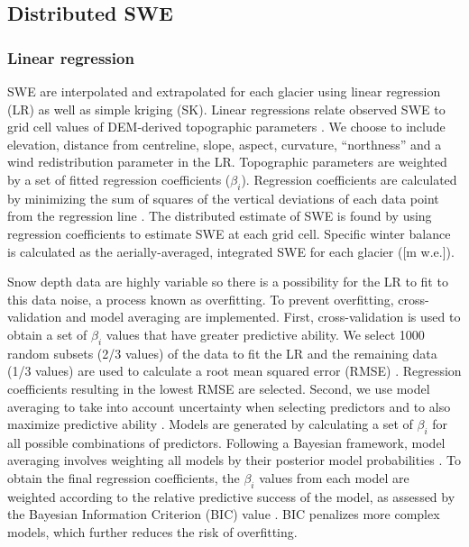 \documentclass[twocolumn, letterpaper]{igs}
\begin{document}
\subsection{Distributed SWE}

\subsubsection{Linear regression}

SWE are interpolated and extrapolated for each glacier using linear regression (LR) as well as simple kriging (SK). Linear regressions relate observed SWE to grid cell values of DEM-derived topographic parameters \citep{Davis1986}. We choose to include elevation, distance from centreline, slope, aspect, curvature, ``northness'' and a wind redistribution parameter in the LR. Topographic parameters are weighted by a set of fitted regression coefficients ($\beta_i$). Regression coefficients are calculated by minimizing the sum of squares of the vertical deviations of each data point from the regression line \citep{Davis1986}. The distributed estimate of SWE is found by using regression coefficients to estimate SWE at each grid cell. Specific winter balance is calculated as the aerially-averaged, integrated SWE for each glacier ([m w.e.]). 

Snow depth data are highly variable so there is a possibility for the LR to fit to this data noise, a process known as overfitting. To prevent overfitting, cross-validation and model averaging are implemented. First, cross-validation is used to obtain a set of $\beta_i$ values that have greater predictive ability. We select 1000 random subsets (2/3 values) of the data to fit the LR and the remaining data (1/3 values) are used to calculate a root mean squared error (RMSE) \citep{Kohavi1995}. Regression coefficients resulting in the lowest RMSE are selected. Second, we use model averaging to take into account uncertainty when selecting predictors and to also maximize predictive ability \citep{Madigan1994}. Models are generated by calculating a set of $\beta_i$ for all possible combinations of predictors. Following a Bayesian framework, model averaging involves weighting all models by their posterior model probabilities \citep{Raftery1997}. To obtain the final regression coefficients, the $\beta_i$ values from each model are weighted according to the relative predictive success of the model, as assessed by the Bayesian Information Criterion (BIC) value \citep{Burnham2004}. BIC penalizes more complex models, which further reduces the risk of overfitting.
\end{document}
